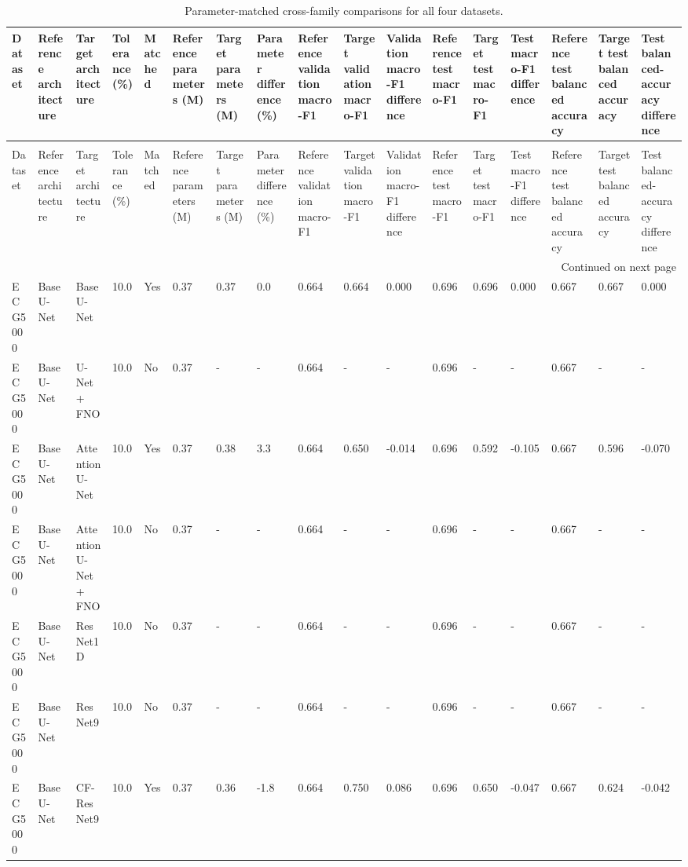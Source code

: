 \begin{longtable}{lllllllllllllllll}
\caption{Parameter-matched cross-family comparisons for all four datasets.} \label{tab:param_matched_cross_family_all_datasets} \\
\toprule
Dataset & Reference architecture & Target architecture & Tolerance (\%) & Matched & Reference parameters (M) & Target parameters (M) & Parameter difference (\%) & Reference validation macro-F1 & Target validation macro-F1 & Validation macro-F1 difference & Reference test macro-F1 & Target test macro-F1 & Test macro-F1 difference & Reference test balanced accuracy & Target test balanced accuracy & Test balanced-accuracy difference \\
\midrule
\endfirsthead
\caption[]{Parameter-matched cross-family comparisons for all four datasets.} \\
\toprule
Dataset & Reference architecture & Target architecture & Tolerance (\%) & Matched & Reference parameters (M) & Target parameters (M) & Parameter difference (\%) & Reference validation macro-F1 & Target validation macro-F1 & Validation macro-F1 difference & Reference test macro-F1 & Target test macro-F1 & Test macro-F1 difference & Reference test balanced accuracy & Target test balanced accuracy & Test balanced-accuracy difference \\
\midrule
\endhead
\midrule
\multicolumn{17}{r}{Continued on next page} \\
\midrule
\endfoot
\bottomrule
\endlastfoot
ECG5000 & Base U-Net & Base U-Net & 10.0 & Yes & 0.37 & 0.37 & 0.0 & 0.664 & 0.664 & 0.000 & 0.696 & 0.696 & 0.000 & 0.667 & 0.667 & 0.000 \\
ECG5000 & Base U-Net & U-Net + FNO & 10.0 & No & 0.37 & - & - & 0.664 & - & - & 0.696 & - & - & 0.667 & - & - \\
ECG5000 & Base U-Net & Attention U-Net & 10.0 & Yes & 0.37 & 0.38 & 3.3 & 0.664 & 0.650 & -0.014 & 0.696 & 0.592 & -0.105 & 0.667 & 0.596 & -0.070 \\
ECG5000 & Base U-Net & Attention U-Net + FNO & 10.0 & No & 0.37 & - & - & 0.664 & - & - & 0.696 & - & - & 0.667 & - & - \\
ECG5000 & Base U-Net & ResNet1D & 10.0 & No & 0.37 & - & - & 0.664 & - & - & 0.696 & - & - & 0.667 & - & - \\
ECG5000 & Base U-Net & ResNet9 & 10.0 & No & 0.37 & - & - & 0.664 & - & - & 0.696 & - & - & 0.667 & - & - \\
ECG5000 & Base U-Net & CF-ResNet9 & 10.0 & Yes & 0.37 & 0.36 & -1.8 & 0.664 & 0.750 & 0.086 & 0.696 & 0.650 & -0.047 & 0.667 & 0.624 & -0.042 \\

\end{longtable}
